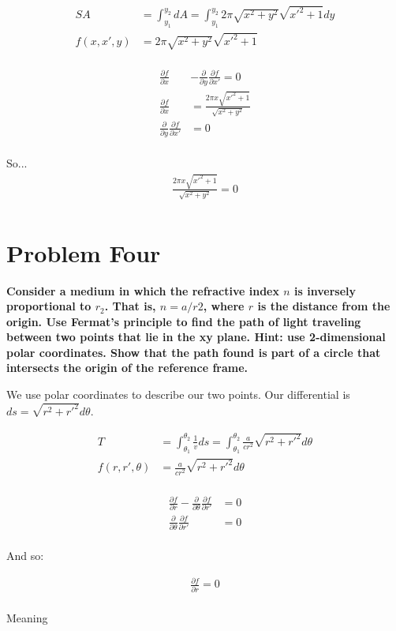 \documentclass[10pt]{article} %
\begin{document}
\begin{align*}
  SA &= \int_{y_1}^{y_2} dA = \int_{y_1}^{y_2} 2\pi\sqrt{x^2+y^2}\sqrt{x'^2+1}dy\\
  f(x, x', y) &= 2\pi\sqrt{x^2+y^2}\sqrt{x'^2+1}\\
\end{align*}

\begin{align*}
  \frac{\partial f}{\partial x} &- \frac{\partial}{\partial y} \frac{\partial f}{\partial x'} = 0\\
  \frac{\partial f}{\partial x} &= \frac{2\pi x\sqrt{x'^2+1}}{\sqrt{x^2+y^2}}\\
  \frac{\partial}{\partial y} \frac{\partial f}{\partial x'} &= 0\\
\end{align*}

So...
\begin{align*}
  \frac{2\pi x\sqrt{x'^2+1}}{\sqrt{x^2+y^2}} = 0\\
\end{align*}

\section{Problem Four}
\textbf{Consider a medium in which the refractive index $n$ is inversely proportional to $r_2$. That is, $n=a/r2$, where $r$ is the distance from the origin. Use Fermat’s principle to find the path of light traveling between two points that lie in the xy plane. Hint: use 2-dimensional polar coordinates. Show that the path found is part of a circle that intersects the origin of the reference frame.}

We use polar coordinates to describe our two points. Our differential is $ds = \sqrt{r^2+r'^2}d\theta$.

\begin{align*}
  T &= \int_{\theta_1}^{\theta_2} \frac{1}{v}ds = \int_{\theta_1}^{\theta_2} \frac{a}{cr^2}\sqrt{r^2+r'^2}d\theta\\
  f(r,r',\theta) &= \frac{a}{cr^2}\sqrt{r^2+r'^2}d\theta\\
\end{align*}

\begin{align*}
  \frac{\partial f}{\partial r} - \frac{\partial}{\partial \theta} \frac{\partial f}{\partial r'} &= 0\\
  \frac{\partial}{\partial \theta} \frac{\partial f}{\partial r'} &= 0\\
\end{align*}

And so:

\begin{align*}
    \frac{\partial f}{\partial r} = 0\\
\end{align*}

Meaning 
\end{document}
